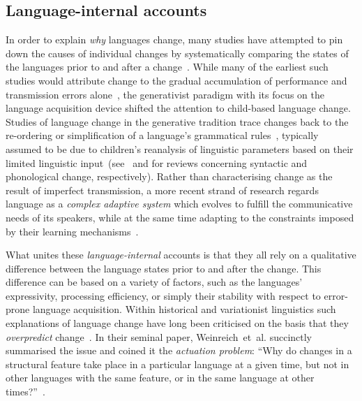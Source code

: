 \documentclass[10pt]{article}
\begin{document}
\subsection{Language-internal accounts}

In order to explain \emph{why} languages change, many studies have attempted to pin down the causes of individual changes by systematically comparing the states of the languages prior to and after a change~\citep{Hockett1965,McMahon1994}. While many of the earliest such studies would attribute change to the gradual accumulation of performance and transmission errors alone~\citep[e.g.][]{Jespersen1922,Hockett1958}, the generativist paradigm with its focus on the language acquisition device shifted the attention to child-based language change. Studies of language change in the generative tradition trace changes back to the re-ordering or simplification of a language's grammatical rules~\citep{Kiparsky1968,Wang1969,Bailey1973,Lass1980,Vennemann1983}, 
typically assumed to be due to children's reanalysis of linguistic parameters based on their limited linguistic input~(see~\citet{Kroch2001} and \citet{Foulkes2013} for reviews concerning syntactic and phonological change, respectively).
Rather than characterising change as the result of imperfect transmission, a more recent strand of research regards language as a \emph{complex adaptive system} which evolves to fulfill the communicative needs of its speakers, while at the same time adapting to the constraints imposed by their learning mechanisms~\citep{Kirby1999,Steels2000,Griffiths2007,LCAS2009}.

What unites these \emph{language-internal} accounts is that they all rely on a qualitative difference between the language states prior to and after the change. This difference can be based on a variety of factors, such as the languages' expressivity, processing efficiency, or simply their stability with respect to error-prone language acquisition. Within historical and variationist linguistics such explanations of language change have long been criticised on the basis that they \emph{overpredict} change~\citep{Saussure1959,Greenberg1959,Weinreich1968,Lass1980,Ohala1989,Croft2000,Labov2001,Winter-Froemel2008}. In their seminal paper, Weinreich~et~al. succinctly summarised the issue and coined it the \emph{actuation problem}: ``Why do changes in a structural feature take place in a particular language at a given time, but not in other languages with the same feature, or in the same language at other times?''~\citep[p.102]{Weinreich1968}.
\end{document}
